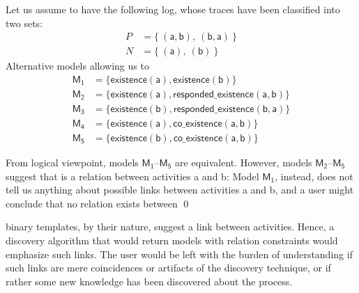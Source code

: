 \begin{example}
\label{ex:unaryVsBinary}
Let us assume %
 to have the following log, whose traces have been classified into two sets:
%
\begin{align*}
P & = \{\ (\mathsf{a}, \mathsf{b}),\ (\mathsf{b}, \mathsf{a})\ \} \\
N & = \{\ (\mathsf{a}),\ (\mathsf{b})\ \}
\end{align*}
%
Alternative models allowing us to %
\begin{align*}
\mathsf{M_1} & = \{ \mathsf{existence(a),existence(b)}\} \\
\mathsf{M_2} & = \{ \mathsf{existence(a), responded\_existence(a, b)}\} \\
\mathsf{M_3} & = \{ \mathsf{existence(b), responded\_existence(b, a)}\} \\
\mathsf{M_4} & = \{ \mathsf{existence(a), co\_existence(a, b)}\} \\
\mathsf{M_5} & = \{ \mathsf{existence(b), co\_existence(a, b)}\}
\end{align*}
%

From %
 logical viewpoint, models $\mathsf{M_1}$--$\mathsf{M_5}$ are equivalent. However, models $\mathsf{M_2}$--$\mathsf{M_5}$ suggest that  
 is a relation between  activities \textsf{a} and \textsf{b}: %
 Model $\mathsf{M_1}$, instead, does not tell us anything about possible links between activities \textsf{a} and \textsf{b}, and a user might conclude that no relation exists between %
\qed
\end{example}

\declare binary templates, by their nature, suggest a link between activities. Hence, a discovery algorithm that would return models with relation constraints would emphasize such links. The user would be left with the burden of understanding if such links are mere coincidences or artifacts of the discovery technique, or if rather some new knowledge has been discovered about the process.

